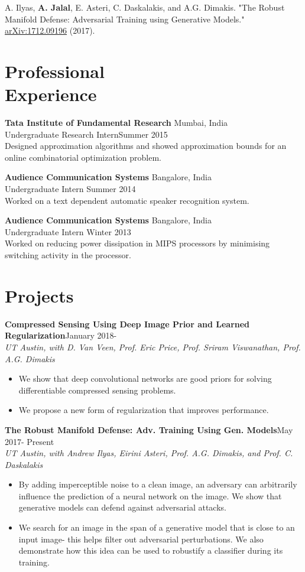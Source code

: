 \documentclass[margin, 11pt]{res} %
\begin{document}
\begin{resume}
A. Ilyas, {\bf A. Jalal}, E. Asteri, C. Daskalakis, and A.G. Dimakis. "The Robust Manifold Defense: Adversarial Training using Generative Models." \href{https://arxiv.org/abs/1712.09196}{arXiv:1712.09196} (2017). 

\section{\large Professional \\ Experience} 
{\bf Tata Institute of Fundamental Research} \hfill Mumbai, India\\
Undergraduate Research Intern\hfill Summer 2015\\
Designed approximation algorithms and showed approximation bounds for an online combinatorial optimization problem.

{\bf Audience Communication Systems} \hfill Bangalore, India\\
Undergraduate Intern \hfill Summer 2014\\
Worked on a text dependent automatic speaker recognition system.

{\bf Audience Communication Systems} \hfill Bangalore, India\\
Undergraduate Intern \hfill Winter 2013\\
Worked on reducing power dissipation in MIPS processors by minimising switching activity
in the processor.

\section{\large Projects}
{\bf Compressed Sensing Using Deep Image Prior and Learned Regularization}\hfill January 2018- \\
{\sl UT Austin, with D. Van Veen, Prof. Eric Price, Prof. Sriram Viswanathan, Prof. A.G. Dimakis}
\begin{itemize}\itemsep -2pt
	\item We show that deep convolutional networks are good priors for solving differentiable compressed sensing problems.
	\item We propose a new form of regularization that improves performance.
\end{itemize}

{\bf The Robust Manifold Defense: Adv. Training Using Gen. Models}\hfill May 2017- Present\\
{\sl UT Austin, with Andrew Ilyas, Eirini Asteri, Prof. A.G. Dimakis, and Prof. C. Daskalakis}
\begin{itemize}\itemsep -2pt
	\item By adding imperceptible noise to a clean image, an adversary can arbitrarily influence the prediction of a neural network on the image. We show that generative models can defend against adversarial attacks.
	\item We search for an image in the span of a generative model that is close to an input image- this helps filter out adversarial perturbations. We also demonstrate how this idea can be used to robustify a classifier during its training.
\end{itemize}


\end{resume}
\end{document}
